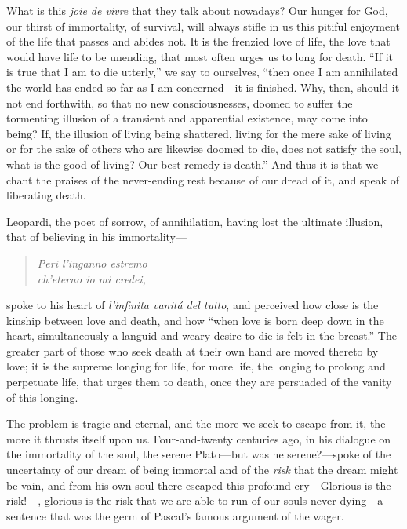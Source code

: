 What is this \textit{joie de vivre} that they talk about nowadays? Our
hunger for God, our thirst of immortality, of survival, will always
stifle in us this pitiful enjoyment of the life that passes and abides
not. It is the frenzied love of life, the love that would have life to
be unending, that most often urges us to long for death. ``If it is
true that I am to die utterly,'' we say to ourselves, ``then once I am
annihilated the world has ended so far as I am con\-cerned---it is
finished. Why, then, should it not end forthwith, so that no new
consciousnesses, doomed to suffer the tormenting illusion of a
transient and apparential existence, may come into being? If, the
illusion of living being shattered, living for the mere sake of living
or for the sake of others who are likewise doomed to die, does not
satisfy the soul, what is the good of living? Our best remedy is
death.'' And thus it is that we chant the praises of the never-ending
rest because of our dread of it, and speak of liberating death.

Leopardi, the poet of sorrow, of annihilation, having lost the
ultimate illusion, that of believing in his immortality---

\begin{verse}
\hspace{1.1em}\textit{Peri l'inganno estremo}\\
\textit{ch'eterno io mi credei,}
\end{verse}

\noindent spoke to his heart of \textit{l'infinita vanit\'a del
tutto}, and perceived how close is the kinship between love and death,
and how ``when love is born deep down in the heart, simultaneously a
languid and weary desire to die is felt in the breast.'' The greater
part of those who seek death at their own hand are moved thereto by
love; it is the supreme longing for life, for more life, the longing
 to prolong and perpetuate life, that urges them to death,
once they are persuaded of the vanity of this longing.

The problem is tragic and eternal, and the more we seek to escape from
it, the more it thrusts itself upon us. Four-and-twenty centuries ago,
in his dialogue on the immortality of the soul, the serene
Pla\-to---but was he serene?---spoke of the uncertainty of our dream
of being immortal and of the \textit{risk} that the dream might be
vain, and from his own soul there escaped this profound cry---Glorious
is the risk!---, glorious is the risk that
we are able to run of our souls never dy\-ing---a sentence that was
the germ of Pascal's famous argument of the wager.

